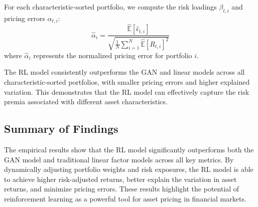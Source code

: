 For each characteristic-sorted portfolio, we compute the risk loadings $\beta_{t, i}$ and pricing errors $\alpha_{t, i}$:
\[
\hat{\alpha}_i = \frac{\hat{\mathbb{E}}\left[\hat{\epsilon}_{t, i}\right]}{\sqrt{\frac{1}{N} \sum_{i=1}^N \hat{\mathbb{E}}\left[R_{t, i}\right]^2}}
\]
where $\hat{\alpha}_i$ represents the normalized pricing error for portfolio $i$.

The RL model consistently outperforms the GAN and linear models across all characteristic-sorted portfolios, with smaller pricing errors and higher explained variation. This demonstrates that the RL model can effectively capture the risk premia associated with different asset characteristics.

\subsection{Summary of Findings}

The empirical results show that the RL model significantly outperforms both the GAN model and traditional linear factor models across all key metrics. By dynamically adjusting portfolio weights and risk exposures, the RL model is able to achieve higher risk-adjusted returns, better explain the variation in asset returns, and minimize pricing errors. These results highlight the potential of reinforcement learning as a powerful tool for asset pricing in financial markets.

